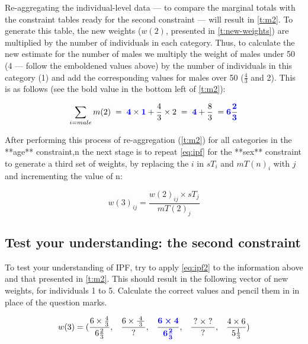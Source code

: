 \documentclass[a4paper, 11pt, twoside]{article}
\begin{document}
Re-aggregating the individual-level data --- to compare the marginal totals with the constraint tables
ready for the second constraint --- will result in
\cref{t:m2}. To generate this table, the new weights ($w(2)$,
presented in \cref{t:new-weights}) are multiplied by the 
number of individuals in each category. Thus, to calculate the new
estimate for the number of males we multiply the weight of
males under 50 (4 --- follow the emboldened values above) by the
number of individuals in this category (1) and add the corresponding values
for males over 50 ($\frac{4}{3}$ and 2). This is as follows
(see the bold value in the bottom left of \cref{t:m2}):

\begin{equation}
\sum_{i = male} m(2) \; = \; \textbf{\color{blue} 4} \times \textbf{\color{blue}1} + \frac{4}{3} \times 2 \; =  \;
\textbf{\color{blue}4} + \frac{8}{3} \; = \textbf{\color{blue}6} \frac{\textbf{\color{blue}2}}{\textbf{\color{blue}3}}
\end{equation}

After performing this process of re-aggregation (\cref{t:m2}) for all categories
in the **age** constraint,n
the next stage is to repeat \cref{eq:ipf} for the **sex** constraint to generate a
third set of weights, by replacing
the $i$ in $sT_{i}$ and $mT(n)_{i}$ with $j$ and incrementing the value of n:

\begin{equation}
w(3)_{ij} = \frac{w(2)_{ij} \times sT_{j}}{mT(2)_{j}}
\label{eq:ipf2}
\end{equation}

\subsection{Test your understanding: the second constraint}
To test your understanding of IPF, try to apply \cref{eq:ipf2} to the
information above
and that presented in \cref{t:m2}.
This should result in the following vector of new weights, for individuals 1 to
5. Calculate the correct values and pencil them in in place of the question
marks.  %


\begin{equation}
w(3) = (\frac{6 \times \frac{4}{3}}{6 \frac{2}{3}},\;\;\; \frac{6 \times
\frac{\;4\;}{\;3\;}}{\;?\;},\;\;\; \boldsymbol{ \frac{\color{blue}6 \times 4}{\color{blue} 6\frac{2}{3}
}}, \;\;\;\frac{\;?\; \times \;?\;}{?}, \;\;\;\frac{4 \times 6}{5 \frac{1}{3}})
\end{equation}
\end{document}
